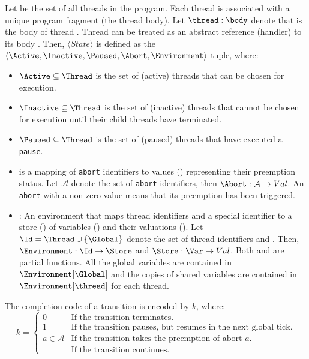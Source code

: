 Let \Thread{} be the set of all 
threads in the program. Each thread 
is associated with a unique program fragment 
\body{} (the thread body). Let $\thread:\body$ 
denote that \body{} is the body of thread 
\thread{}. Thread \thread{} can be treated
as an abstract reference (handler) to its 
body \body{}. Then, $\langle State \rangle$ is defined as the 
$\langle \Active, \Inactive, \Paused, \Abort, \Environment \rangle$ tuple, where:
\begin{itemize}
	\item $\Active \subseteq \Thread$ is the set of (active) threads that can be chosen for execution.
	\item $\Inactive \subseteq \Thread$ is the set of (inactive) threads that cannot be chosen for execution
		  until their child threads have terminated.
	\item $\Paused \subseteq \Thread$ is the set of (paused) threads that have executed a \verb$pause$.
	\item \Abort{} is a mapping of \verb$abort$ identifiers to values (\Val{}) representing their preemption
		  status. Let $\mathcal{A}$ denote the set of \verb$abort$ identifiers, then
		  $\Abort: \mathcal{A} \to Val$. An \verb$abort$ with a non-zero value means that its
		  preemption has been triggered.
	\item \Environment{}: An environment that maps thread identifiers and a special 
		  identifier \Global{} to a store (\Store{}) of variables (\Var{}) and their 
		  valuations (\Val{}). Let $\Id = \Thread \cup \{\Global\}$ denote the set of 
		  thread identifiers and \Global{}. Then, $\Environment: \Id \to \Store$ and 
		  $\Store: \Var \to Val$. Both \Environment{} and \Store{} are partial functions. 
		  All the global variables are contained in $\Environment[\Global]$ 
		  and the copies of shared variables are contained in $\Environment[\thread]$
		  for each thread.
\end{itemize}
The completion code of a transition is encoded by $k$, where:
\begin{equation*}
	k = \begin{cases}
		0					& \text{If the transition terminates.}									\\
		1					& \text{If the transition pauses, but resumes in the next global tick.}	\\
		a \in \mathcal{A}	& \text{If the transition takes the preemption of abort $a$.}			\\
		\bot				& \text{If the transition continues.}
	\end{cases}
\end{equation*}


